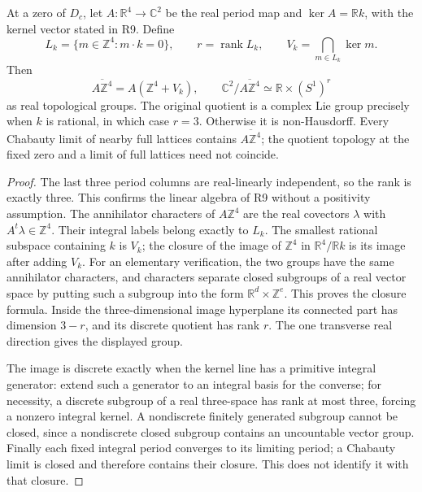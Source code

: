 \begin{proposition}\label{push:src:D.4.3}
At a zero of \(D_c\), let \(A:\mathbb R^4\to\mathbb C^2\) be
the real period map and \(\ker A=\mathbb R k\), with the kernel
vector stated in R9. Define
\[
 L_k=\{m\in\mathbb Z^4:m\cdot k=0\},\qquad r=\operatorname{rank}L_k,
 \qquad V_k=\bigcap_{m\in L_k}\ker m.
\]
Then
\[
 \overline{A\mathbb Z^4}=A(\mathbb Z^4+V_k),\qquad
 \mathbb C^2/\overline{A\mathbb Z^4}\simeq
                         \mathbb R\times(S^1)^r
\]
as real topological groups. The original quotient is a complex Lie
group precisely when \(k\) is rational, in which case \(r=3\).
Otherwise it is non-Hausdorff. Every Chabauty limit of nearby full
lattices contains \(\overline{A\mathbb Z^4}\); the quotient topology
at the fixed zero and a limit of full lattices need not coincide.
\end{proposition}
\begin{proof}
The last three period columns are real-linearly independent, so the
rank is exactly three. This confirms the linear algebra of R9
without a positivity assumption. The annihilator characters of
\(A\mathbb Z^4\) are the real covectors \(\lambda\) with
\(A^t\lambda\in\mathbb Z^4\). Their integral labels belong exactly
to \(L_k\). The smallest rational subspace containing \(k\) is
\(V_k\); the closure of the image of \(\mathbb Z^4\) in
\(\mathbb R^4/\mathbb R k\) is its image after adding \(V_k\).
For an elementary verification, the two groups have the same
annihilator characters, and characters separate closed subgroups of
a real vector space by putting such a subgroup into the form
\(\mathbb R^d\times\mathbb Z^e\). This proves the closure formula.
Inside the three-dimensional image hyperplane its connected part
has dimension \(3-r\), and its discrete quotient has rank \(r\).
The one transverse real direction gives the displayed group.

The image is discrete exactly when the kernel line has a primitive
integral generator: extend such a generator to an integral basis for
the converse; for necessity, a discrete subgroup of a real
three-space has rank at most three, forcing a nonzero integral
kernel. A nondiscrete finitely generated subgroup cannot be closed,
since a nondiscrete closed subgroup contains an uncountable vector
group. Finally each fixed integral period converges to its limiting
period; a Chabauty limit is closed and therefore contains their
closure. This does not identify it with that closure.
\end{proof}


